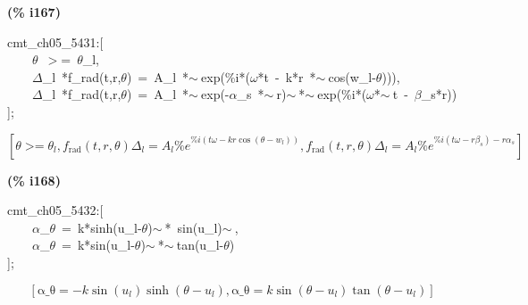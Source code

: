 \documentclass[fleqn]{article}
\begin{document}
\noindent
\begin{minipage}[t]{4.000000em}\color{red}\bfseries
(\% i167)	
\end{minipage}
\begin{minipage}[t]{\textwidth}\color{blue}
cmt\_ch05\_5431:[\\
\ \ \ \ \ensuremath{\theta}\ \ensuremath{>}=\ \ensuremath{\theta}\_l,\\
\ \ \ \ \ensuremath{\Delta}\_l\ *f\_rad(t,r,\ensuremath{\theta})\ =\ A\_l\ *\ensuremath{\sim\ }exp(\%i*(\ensuremath{\omega}*t\ -\ k*r\ *\ensuremath{\sim\ }cos(w\_l-\ensuremath{\theta}))),\\
\ \ \ \ \ensuremath{\Delta}\_l\ *f\_rad(t,r,\ensuremath{\theta})\ =\ A\_l\ *\ensuremath{\sim\ }exp(-\ensuremath{\alpha}\_s\ *\ensuremath{\sim\ }r)\ensuremath{\sim\ }*\ensuremath{\sim\ }exp(\%i*(\ensuremath{\omega}*\ensuremath{\sim\ }t\ -\ \ensuremath{\beta}\_s*r))\\
];
\end{minipage}
\[\displaystyle \tag{\% o167} 
\operatorname{[}\theta \operatorname{>  =}{{\theta }_l}\operatorname{,}{f_{\ensuremath{\mathrm{rad}}}}\left( t\operatorname{,}r\operatorname{,}\theta \right)  {{\Delta }_l}={A_l} {{\% e}^{\% i \left( t \omega -k r \cos{\left( \theta -{w_l}\right) }\right) }}\operatorname{,}{f_{\ensuremath{\mathrm{rad}}}}\left( t\operatorname{,}r\operatorname{,}\theta \right)  {{\Delta }_l}={A_l} {{\% e}^{\% i \left( t \omega -r {{\beta }_s}\right) -r {{\alpha }_s}}}\operatorname{]}\mbox{}
\]


\noindent
\begin{minipage}[t]{4.000000em}\color{red}\bfseries
(\% i168)	
\end{minipage}
\begin{minipage}[t]{\textwidth}\color{blue}
cmt\_ch05\_5432:[\\
\ \ \ \ \ensuremath{\alpha}\_\ensuremath{\theta}\ =\ k*sinh(u\_l-\ensuremath{\theta})\ensuremath{\sim\ }*\ sin(u\_l)\ensuremath{\sim\ },\ \\
\ \ \ \ \ensuremath{\alpha}\_\ensuremath{\theta}\ =\ k*sin(u\_l-\ensuremath{\theta})\ensuremath{\sim\ }*\ensuremath{\sim\ }tan(u\_l-\ensuremath{\theta})\\
];
\end{minipage}
\[\displaystyle \tag{\% o168} 
\left[ \ensuremath{\mathrm{\alpha \_ \theta }}=-k \sin{\left( {u_l}\right) } \sinh{\left( \theta -{u_l}\right) }\operatorname{,}\ensuremath{\mathrm{\alpha \_ \theta }}=k \sin{\left( \theta -{u_l}\right) } \tan{\left( \theta -{u_l}\right) }\right] \mbox{}
\]
\end{document}
